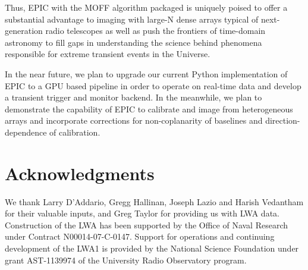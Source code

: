 \documentclass[a4paper,fleqn,usenatbib]{mnras}
\begin{document}
Thus, EPIC with the MOFF algorithm packaged is uniquely poised to offer a
substantial advantage to imaging with large-N dense arrays typical of 
next-generation radio telescopes as well as push the frontiers of 
time-domain astronomy to fill gaps in understanding the science behind 
phenomena responsible for extreme transient events in the Universe.

In the near future, we plan to upgrade our current Python implementation 
of EPIC to a GPU based pipeline in order to operate on real-time data and 
develop a transient trigger and monitor backend. In the meanwhile, we plan 
to demonstrate the capability of EPIC to calibrate and image from heterogeneous 
arrays and incorporate corrections for non-coplanarity of baselines and 
direction-dependence of calibration. 

\section*{Acknowledgments}

We thank Larry D'Addario, Gregg Hallinan, Joseph Lazio and Harish Vedantham for 
their valuable inputs, and Greg Taylor for providing us with LWA data. 
Construction of the LWA has been supported by the Office of Naval Research under 
Contract N00014-07-C-0147. Support for operations and continuing development of 
the LWA1 is provided by the National Science Foundation under grant AST-1139974 
of the University Radio Observatory program.



%  








\bsp	%
\label{lastpage}
\end{document}
